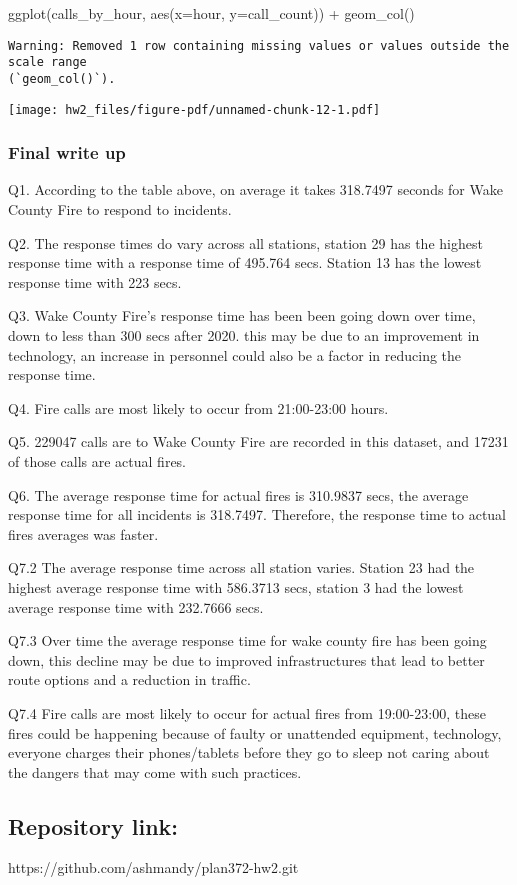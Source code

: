 \documentclass[
  letterpaper,
  DIV=11,
  numbers=noendperiod]{scrartcl}
\newenvironment{Shaded}{\begin{snugshade}}{\end{snugshade}}
\newcommand{\AttributeTok}[1]{\textcolor[rgb]{0.40,0.45,0.13}{#1}}
\newcommand{\FunctionTok}[1]{\textcolor[rgb]{0.28,0.35,0.67}{#1}}
\newcommand{\NormalTok}[1]{\textcolor[rgb]{0.00,0.23,0.31}{#1}}
\newcommand{\SpecialCharTok}[1]{\textcolor[rgb]{0.37,0.37,0.37}{#1}}
\begin{document}
\begin{Shaded}
\begin{Highlighting}[]
\FunctionTok{ggplot}\NormalTok{(calls\_by\_hour, }\FunctionTok{aes}\NormalTok{(}\AttributeTok{x=}\NormalTok{hour, }\AttributeTok{y=}\NormalTok{call\_count)) }\SpecialCharTok{+}
  \FunctionTok{geom\_col}\NormalTok{()}
\end{Highlighting}
\end{Shaded}

\begin{verbatim}
Warning: Removed 1 row containing missing values or values outside the scale range
(`geom_col()`).
\end{verbatim}

\texttt{[image: hw2\_files/figure-pdf/unnamed-chunk-12-1.pdf]}

\subsubsection{Final write up}\label{final-write-up}

Q1. According to the table above, on average it takes 318.7497 seconds
for Wake County Fire to respond to incidents.

Q2. The response times do vary across all stations, station 29 has the
highest response time with a response time of 495.764 secs. Station 13
has the lowest response time with 223 secs.

Q3. Wake County Fire's response time has been been going down over time,
down to less than 300 secs after 2020. this may be due to an improvement
in technology, an increase in personnel could also be a factor in
reducing the response time.

Q4. Fire calls are most likely to occur from 21:00-23:00 hours.

Q5. 229047 calls are to Wake County Fire are recorded in this dataset,
and 17231 of those calls are actual fires.

Q6. The average response time for actual fires is 310.9837 secs, the
average response time for all incidents is 318.7497. Therefore, the
response time to actual fires averages was faster.

Q7.2 The average response time across all station varies. Station 23 had
the highest average response time with 586.3713 secs, station 3 had the
lowest average response time with 232.7666 secs.

Q7.3 Over time the average response time for wake county fire has been
going down, this decline may be due to improved infrastructures that
lead to better route options and a reduction in traffic.

Q7.4 Fire calls are most likely to occur for actual fires from
19:00-23:00, these fires could be happening because of faulty or
unattended equipment, technology, everyone charges their phones/tablets
before they go to sleep not caring about the dangers that may come with
such practices.

\subsection{Repository link:}\label{repository-link}

https://github.com/ashmandy/plan372-hw2.git
\end{document}
